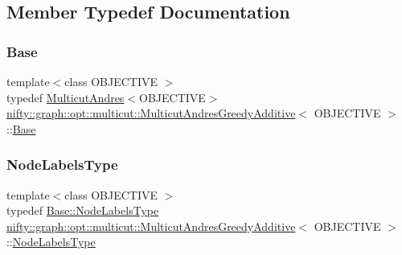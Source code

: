 \subsection{Member Typedef Documentation}
\mbox{\label{classnifty_1_1graph_1_1opt_1_1multicut_1_1MulticutAndresGreedyAdditive_a2c186374cb769da99f59cf4072527c6d}} 
\subsubsection{\texorpdfstring{Base}{Base}}
{\footnotesize\ttfamily template$<$class O\+B\+J\+E\+C\+T\+I\+VE $>$ \\
typedef \hyperlink{classnifty_1_1graph_1_1opt_1_1multicut_1_1MulticutAndres}{Multicut\+Andres}$<$O\+B\+J\+E\+C\+T\+I\+VE$>$ \hyperlink{classnifty_1_1graph_1_1opt_1_1multicut_1_1MulticutAndresGreedyAdditive}{nifty\+::graph\+::opt\+::multicut\+::\+Multicut\+Andres\+Greedy\+Additive}$<$ O\+B\+J\+E\+C\+T\+I\+VE $>$\+::\hyperlink{classnifty_1_1graph_1_1opt_1_1multicut_1_1MulticutAndresGreedyAdditive_a2c186374cb769da99f59cf4072527c6d}{Base}}

\mbox{\label{classnifty_1_1graph_1_1opt_1_1multicut_1_1MulticutAndresGreedyAdditive_a69eb808caafaf219ce18389947649f8a}} 
\subsubsection{\texorpdfstring{Node\+Labels\+Type}{NodeLabelsType}}
{\footnotesize\ttfamily template$<$class O\+B\+J\+E\+C\+T\+I\+VE $>$ \\
typedef \hyperlink{classnifty_1_1graph_1_1opt_1_1multicut_1_1MulticutAndres_a6cd9d64abc4a98aa9745ce1ef0d4ecfe}{Base\+::\+Node\+Labels\+Type} \hyperlink{classnifty_1_1graph_1_1opt_1_1multicut_1_1MulticutAndresGreedyAdditive}{nifty\+::graph\+::opt\+::multicut\+::\+Multicut\+Andres\+Greedy\+Additive}$<$ O\+B\+J\+E\+C\+T\+I\+VE $>$\+::\hyperlink{classnifty_1_1graph_1_1opt_1_1multicut_1_1MulticutAndres_a6cd9d64abc4a98aa9745ce1ef0d4ecfe}{Node\+Labels\+Type}}

